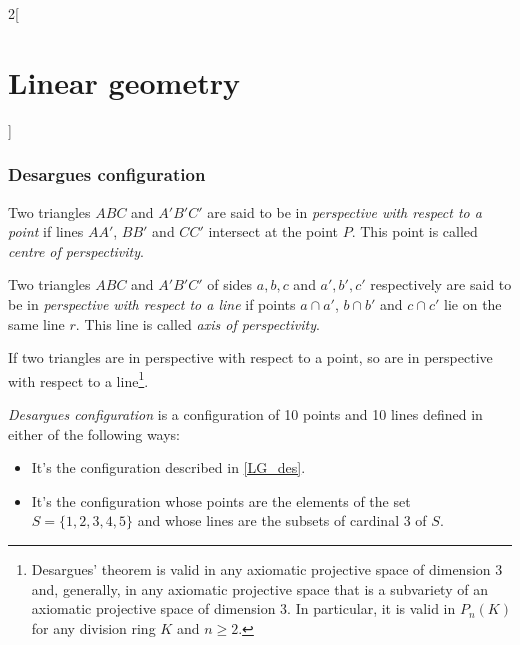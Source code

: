 \documentclass[../../../main.tex]{subfiles}
\begin{document}
\begin{multicols}{2}[\section{Linear geometry}]
    \subsubsection{Desargues configuration}
    \begin{definition}
        Two triangles $ABC$ and $A'B'C'$ are said to be in \textit{perspective with respect to a point} if lines $AA'$, $BB'$ and $CC'$ intersect at the point $P$. This point is called \textit{centre of perspectivity}.
    \end{definition}
    \begin{definition}
        Two triangles $ABC$ and $A'B'C'$ of sides $a,b,c$ and $a',b',c'$ respectively are said to be in \textit{perspective with respect to a line} if points $a\cap a'$, $b\cap b'$ and $c\cap c'$ lie on the same line $r$. This line is called \textit{axis of perspectivity}.
    \end{definition}
    \begin{theorem}
        If two triangles are in perspective with respect to a point, so are in perspective with respect to a line\footnote{Desargues' theorem is valid in any axiomatic projective space of dimension 3 and, generally, in any axiomatic projective space that is a subvariety of an axiomatic projective space of dimension 3. In particular, it is valid in $P_n(K)$ for any division ring $K$ and $n\geq2$.}.
    \end{theorem}
    \begin{definition}
        \textit{Desargues configuration} is a configuration of 10 points and 10 lines defined in either of the following ways:
        \begin{itemize}
            \item It's the configuration described in \cref{LG_des}.
                  \begin{center}
                      \begin{minipage}{\linewidth}
                          \centering
                          
                          \label{LG_des}
                      \end{minipage}
                  \end{center}
            \item It's the configuration whose points are the elements of the set $S=\{1,2,3,4,5\}$ and whose lines are the subsets of cardinal 3 of $S$.

\end{itemize}
\end{definition}
\end{multicols}
\end{document}
